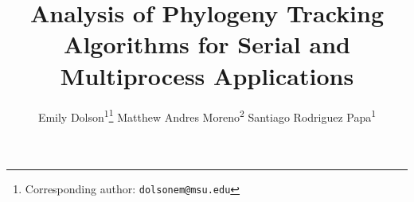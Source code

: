\title{ Analysis of Phylogeny Tracking Algorithms for Serial and Multiprocess Applications }
\author{
    Emily Dolson\textsuperscript{1}\thanks{Corresponding author: \texttt{dolsonem@msu.edu}} \quad
    Matthew Andres Moreno\textsuperscript{2} \quad
    Santiago Rodriguez Papa\textsuperscript{1} \quad
}
\date{}

\newcommand{\affil}[1]{\textsuperscript{#1}}
\newcommand{\affiliations}{
    \affil{1} Michigan State University, East Lansing, United States \\
    \affil{2} University of Michigan, Ann Arbor, United States
}

\maketitle



